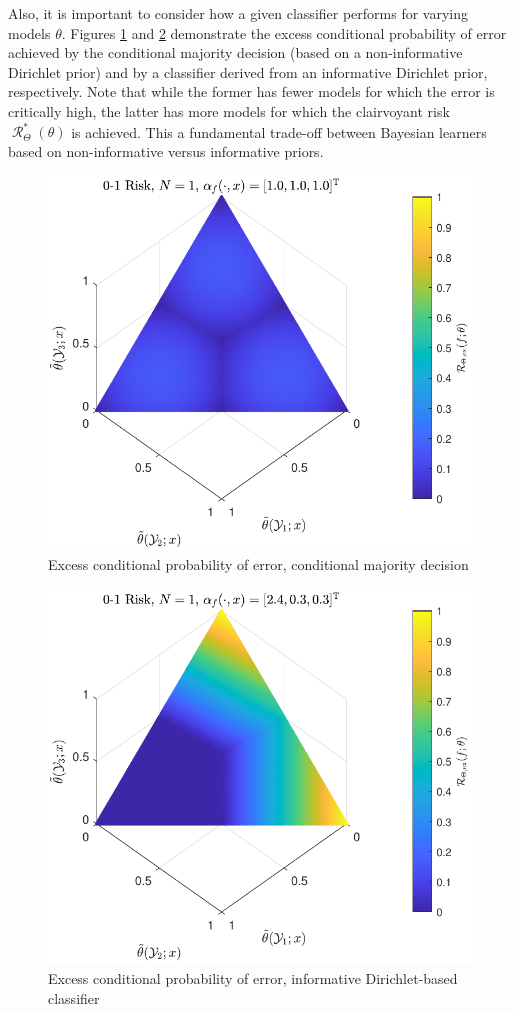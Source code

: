 \documentclass[12pt]{report}
\DeclareMathOperator{\Rcal}{\mathcal{R}}
\begin{document}
Also, it is important to consider how a given classifier performs for varying models $\theta$. Figures \ref{fig:Risk_cond_ex_01_Dir_theta__uni} and \ref{fig:Risk_cond_ex_01_Dir_theta__subj} demonstrate the excess conditional probability of error achieved by the conditional majority decision (based on a non-informative Dirichlet prior) and by a classifier derived from an informative Dirichlet prior, respectively. Note that while the former has fewer models for which the error is critically high, the latter has more models for which the clairvoyant risk $\Rcal_{\Theta}^*(\theta)$ is achieved. This a fundamental trade-off between Bayesian learners based on non-informative versus informative priors.
\begin{figure}
\centering
\includegraphics[width=0.7\linewidth]{Risk_cond_ex_01_Dir_theta__uni.pdf}
\caption{Excess conditional probability of error, conditional majority decision}
\label{fig:Risk_cond_ex_01_Dir_theta__uni}
\end{figure}
%
\begin{figure}
\centering
\includegraphics[width=0.7\linewidth]{Risk_cond_ex_01_Dir_theta__subj.pdf}
\caption{Excess conditional probability of error, informative Dirichlet-based classifier}
\label{fig:Risk_cond_ex_01_Dir_theta__subj}
\end{figure}
\end{document}
